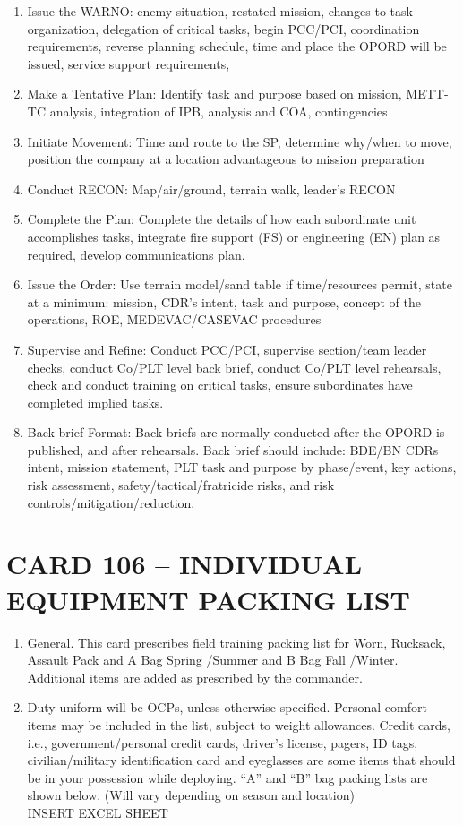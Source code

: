 \documentclass{article}
\begin{document}
\begin{enumerate}
\begin{enumerate}
\item Issue the WARNO: enemy situation, restated mission, changes to task organization, delegation of critical tasks, begin PCC/PCI, coordination requirements, reverse planning schedule, time and place the OPORD will be issued, service support requirements, 
\item Make a Tentative Plan: Identify task and purpose based on mission, METT-TC analysis, integration of IPB, analysis and COA, contingencies
\item Initiate Movement: Time and route to the SP, determine why/when to move, position the company at a location advantageous to mission preparation
\item Conduct RECON: Map/air/ground, terrain walk, leader’s RECON
\item Complete the Plan: Complete the details of how each subordinate unit accomplishes tasks, integrate fire support (FS) or engineering (EN) plan as required, develop communications plan.
\item Issue the Order: Use terrain model/sand table if time/resources permit, state at a minimum: mission, CDR’s intent, task and purpose, concept of the operations, ROE, MEDEVAC/CASEVAC procedures
\item Supervise and Refine: Conduct PCC/PCI, supervise section/team leader checks, conduct Co/PLT level back brief, conduct Co/PLT level rehearsals, check and conduct training on critical tasks, ensure subordinates have completed implied tasks. 
\item Back brief Format: Back briefs are normally conducted after the OPORD is published, and after rehearsals. Back brief should include: BDE/BN CDRs intent, mission statement, PLT task and purpose by phase/event, key actions, risk assessment, safety/tactical/fratricide risks, and risk controls/mitigation/reduction.
	\end{enumerate}
	\end{enumerate}
	
\newpage
\section*{CARD 106 – INDIVIDUAL EQUIPMENT PACKING LIST}
\begin{enumerate}
    \item General. This card prescribes field training packing list for Worn, Rucksack, Assault Pack and A Bag Spring /Summer and B Bag Fall /Winter. Additional items are added as prescribed by the commander.

\item Duty uniform will be OCPs, unless otherwise specified.  Personal comfort items may be included in the list, subject to weight allowances.  Credit cards, i.e., government/personal credit cards, driver’s license, pagers, ID tags, civilian/military identification card and eyeglasses are some items that should be in your possession while deploying.  “A” and “B” bag packing lists are shown below. (Will vary depending on season and location)
\\
INSERT EXCEL SHEET
\end{enumerate}
\end{document}
